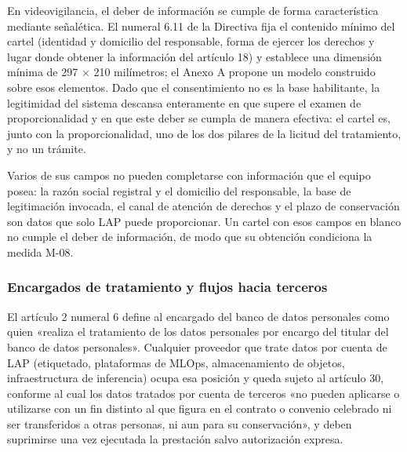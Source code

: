 En videovigilancia, el deber de información se cumple de forma
característica mediante señalética. El numeral 6.11 de la Directiva fija
el contenido mínimo del cartel (identidad y domicilio del responsable,
forma de ejercer los derechos y lugar donde obtener la información del
artículo 18) y establece una dimensión mínima de 297 × 210 milímetros;
el Anexo A propone un modelo construido sobre esos elementos. Dado que
el consentimiento no es la base habilitante, la legitimidad del sistema
descansa enteramente en que supere el examen de proporcionalidad y en
que este deber se cumpla de manera efectiva: el cartel es, junto con la
proporcionalidad, uno de los dos pilares de la licitud del tratamiento,
y no un trámite.

Varios de sus campos no pueden completarse con información que el equipo
posea: la razón social registral y el domicilio del responsable, la base
de legitimación invocada, el canal de atención de derechos y el plazo de
conservación son datos que solo LAP puede proporcionar. Un cartel con
esos campos en blanco no cumple el deber de información, de modo que su
obtención condiciona la medida M-08.

\subsubsection{Encargados de tratamiento y flujos hacia terceros}

El artículo 2 numeral 6 define al encargado del banco de datos
personales como quien «realiza el tratamiento de los datos personales
por encargo del titular del banco de datos personales». Cualquier
proveedor que trate datos por cuenta de LAP (etiquetado, plataformas de
MLOps, almacenamiento de objetos, infraestructura de inferencia) ocupa
esa posición y queda sujeto al artículo 30, conforme al cual los datos
tratados por cuenta de terceros «no pueden aplicarse o utilizarse con un
fin distinto al que figura en el contrato o convenio celebrado ni ser
transferidos a otras personas, ni aun para su conservación», y deben
suprimirse una vez ejecutada la prestación salvo autorización expresa.

